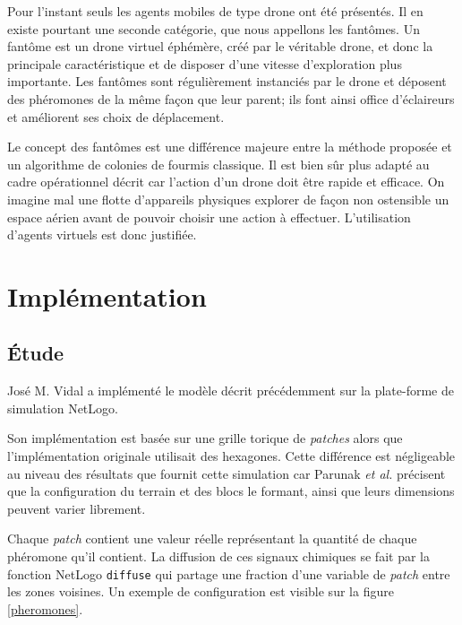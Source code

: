 \documentclass[12pt]{article}
\begin{document}
Pour l'instant seuls les agents mobiles de type drone ont été
présentés. Il en existe pourtant une seconde catégorie, que nous
appellons les fantômes. Un fantôme est un drone virtuel éphémère, créé
par le véritable drone, et donc la principale caractéristique et de
disposer d'une vitesse d'exploration plus importante. Les fantômes
sont régulièrement instanciés par le drone et déposent des phéromones
de la même façon que leur parent; ils font ainsi office d'éclaireurs
et améliorent ses choix de déplacement.

Le concept des fantômes est une différence majeure entre la méthode
proposée et un algorithme de colonies de fourmis classique. Il est
bien sûr plus adapté au cadre opérationnel décrit car l'action d'un
drone doit être rapide et efficace. On imagine mal une flotte
d'appareils physiques explorer de façon non ostensible un espace
aérien avant de pouvoir choisir une action à effectuer. L'utilisation
d'agents virtuels est donc justifiée.

\section{Implémentation}

\subsection{\'Etude}

José M. Vidal a implémenté le modèle décrit précédemment sur la
plate-forme de simulation NetLogo.

Son implémentation est basée sur une grille torique de
\textit{patches} alors que l'implémentation originale utilisait des
hexagones. Cette différence est négligeable au niveau des résultats
que fournit cette simulation car Parunak \textit{et al.} précisent que
la configuration du terrain et des blocs le formant, ainsi que leurs
dimensions peuvent varier librement.

Chaque \textit{patch} contient une valeur réelle représentant la
quantité de chaque phéromone qu'il contient. La diffusion de ces
signaux chimiques se fait par la fonction NetLogo \texttt{diffuse} qui
partage une fraction d'une variable de \textit{patch} entre les zones
voisines. Un exemple de configuration est visible sur la figure
\ref{pheromones}.
\end{document}
